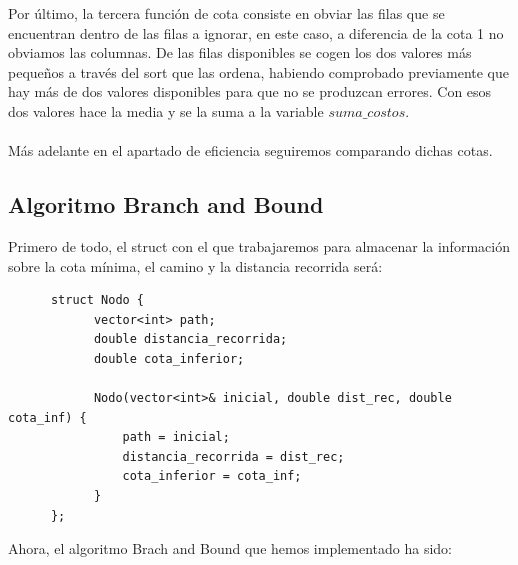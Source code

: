 \documentclass[11pt,openany]{book}
\begin{document}
Por último, la tercera función de cota consiste en obviar las filas que se encuentran dentro de las filas a ignorar, en este caso, a diferencia de la cota 1 no obviamos 
las columnas. De las filas disponibles se cogen los dos valores más pequeños a través del sort que las ordena, habiendo comprobado previamente que hay más de dos valores 
disponibles para que no se produzcan errores. Con esos dos valores hace la media y se la suma a la variable $suma\_costos$.
\\ \\
Más adelante en el apartado de eficiencia seguiremos comparando dichas cotas.

\subsection{Algoritmo Branch and Bound}
Primero de todo, el struct con el que trabajaremos para almacenar la información sobre la cota mínima, el camino y la distancia recorrida será:

\begin{lstlisting}
      struct Nodo {
            vector<int> path;
            double distancia_recorrida; 
            double cota_inferior; 
        
            Nodo(vector<int>& inicial, double dist_rec, double cota_inf) {
                path = inicial;
                distancia_recorrida = dist_rec;
                cota_inferior = cota_inf;
            }
      };
\end{lstlisting}

Ahora, el algoritmo Brach and Bound que hemos implementado ha sido:
\end{document}
